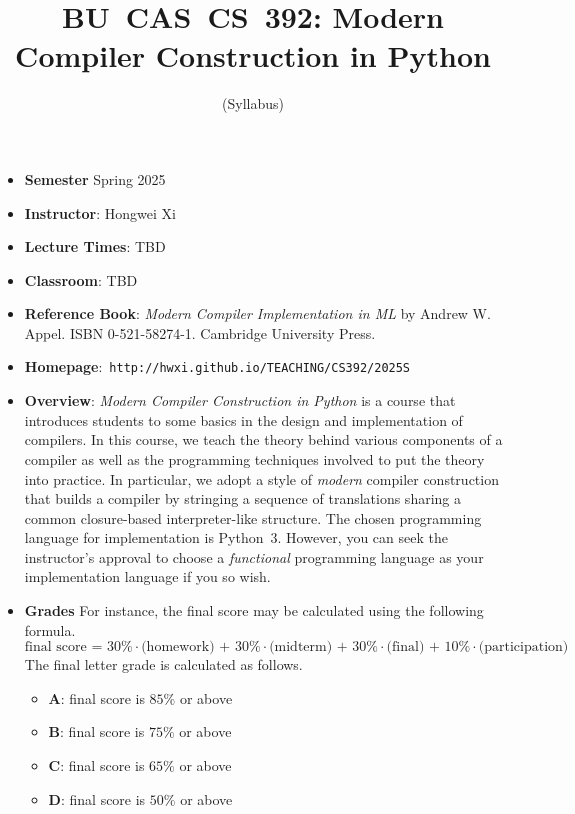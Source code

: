 \documentclass[11pt]{article}
\title{BU~CAS~CS~392: Modern Compiler Construction in Python}
\author{(Syllabus)}
\date{}
\begin{document}
\maketitle
\thispagestyle{empty}

\begin{itemize}
\item {\bf Semester} Spring 2025
\item {\bf Instructor}: Hongwei Xi
\item {\bf Lecture Times}: TBD
\item {\bf Classroom}: TBD
\item {\bf Reference Book}:\kern6pt
{\em Modern Compiler Implementation in ML} by Andrew W. Appel.  ISBN
0-521-58274-1. Cambridge University Press.
\item {\bf Homepage}:~{\tt http://hwxi.github.io/TEACHING/CS392/2025S}
\item {\bf Overview}:
{\em Modern Compiler Construction in Python}
is a course that introduces students to some basics in the design and
implementation of compilers. In this course, we teach the theory
behind various components of a compiler as well as the programming techniques
involved to put the theory into practice. In particular, we adopt a style of
{\em modern} compiler construction that builds a compiler by stringing a sequence of
translations sharing a common closure-based interpreter-like structure.
The chosen programming language for implementation is Python~3.
However, you can seek the instructor's approval to choose a {\em functional}
programming language as your implementation language if you so wish.

\item {\bf Grades}
For instance, the final score may be calculated using the following formula.
\[\mbox{final score = 30\%$\cdot$(homework) + 30\%$\cdot$(midterm) + 30\%$\cdot$(final) + 10\%$\cdot$(participation)}\]
The final letter grade is calculated as follows.
\begin{itemize}
\item{\bf A}: final score is $85\%$ or above
\item{\bf B}: final score is $75\%$ or above
\item{\bf C}: final score is $65\%$ or above
\item{\bf D}: final score is $50\%$ or above
\end{itemize}


\end{itemize}
\end{document}

